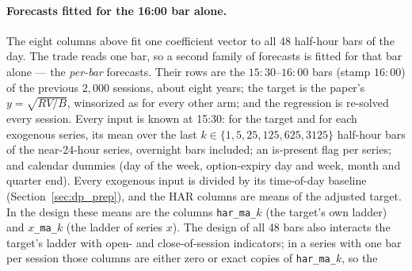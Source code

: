 \paragraph{Forecasts fitted for the 16:00 bar alone.} The eight columns above
fit one coefficient vector to all 48 half-hour bars of the day. The trade reads
one bar, so a second family of forecasts is fitted for that bar alone --- the
\emph{per-bar} forecasts. Their rows are the $15{:}30$--$16{:}00$ bars (stamp
$16{:}00$) of the previous $2{,}000$ sessions, about eight years; the target is
the paper's $y=\sqrt{RV/B}$, winsorized as for every other arm; and the
regression is re-solved every session. Every input is known at 15:30: for the
target and for each exogenous series, its mean over the last
$k\in\{1,5,25,125,625,3125\}$ half-hour bars of the near-24-hour series,
overnight bars included; an is-present flag per series; and calendar dummies
(day of the week, option-expiry day and week, month and quarter end). Every
exogenous input is divided by its time-of-day baseline
(Section~\ref{sec:dp_prep}), and the HAR columns are means of the adjusted
target. In the design these means are the columns
\texttt{har\_ma\_}$k$ (the target's own ladder) and
$x$\texttt{\_ma\_}$k$ (the ladder of series $x$).
The design of all 48 bars also interacts the target's ladder with open- and
close-of-session indicators; in a series with one bar per session those
\cmNDup{} columns are either zero or exact copies of \texttt{har\_ma\_}$k$, so the

